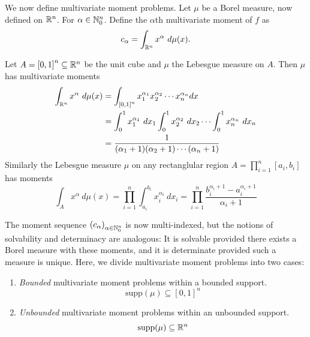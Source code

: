 

We now define multivariate moment problems. Let $\mu$ be a Borel measure, now defined on $\mathbb{R}^n$. For $\alpha \in \mathbb{N}_0^n$. Define the $\alpha$th multivariate moment of $f$ as 
\[
  c_\alpha = \int_{\mathbb{R}^n} x^\alpha ~d\mu(x).
\]

\begin{myexample}
  Let $A = {[0,1]}^n \subseteq \mathbb{R}^n$ be the unit cube and $\mu$ the Lebesgue measure on $A$. Then $\mu$ has multivariate moments
  \begin{align*}
    \int_{\mathbb{R}^n} x^\alpha ~d\mu(x) 
    &= \int_{{[0,1]}^n} x_1^{\alpha_1}x_2^{\alpha_2} \cdots x_n^{\alpha_n} dx \\
    &= \int_0^1 x_1^{\alpha_1} ~dx_1 \int_0^1 x_2^{\alpha_2} ~dx_2 \cdots \int_0^1 x_n^{\alpha_n} ~dx_n \\
    &= \frac{1}{(\alpha_1+1) (\alpha_2+1) \cdots (\alpha_n+1)}
  \end{align*}
  Similarly the Lebesgue measure $\mu$ on any rectanglular region $A = \prod_{i = 1}^n [a_i, b_i]$ has moments
  \[
    \int_A x^\alpha ~d\mu(x) 
    = \prod_{i=1}^n \int_{a_i}^{b_i} x_i^{\alpha_i} ~dx_i
    = \prod_{i = 1}^n \frac{b_i^{\alpha_i + 1} - a_i^{\alpha_i + 1}}{\alpha_i + 1}
  \]
\end{myexample}
The moment sequence ${(c_\alpha)}_{\alpha \in \mathbb{N}_0^n}$ is now multi-indexed, but the notions of solvability and determinacy are analogous: It is solvable provided there exists a Borel measure with these moments, and it is determinate provided such a measure is unique. Here, we divide multivariate moment problems into two cases:

\begin{enumerate}[label=]
  \item \emph{Bounded} multivariate moment problems within a bounded support.
  \[
    \text{supp}(\mu) \subseteq {[0,1]}^n
  \]
  \item \emph{Unbounded} multivariate moment problems within an unbounded support.
  \[
    \text{supp}(\mu) \subseteq \mathbb{R}^n
  \]
\end{enumerate}

